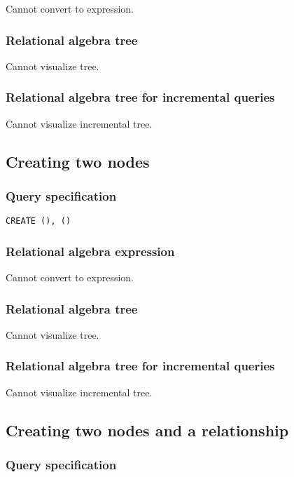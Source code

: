 Cannot convert to expression.

\subsubsection*{Relational algebra tree}

Cannot visualize tree.

\subsubsection*{Relational algebra tree for incremental queries}

Cannot visualize incremental tree.

\subsection{Creating two nodes}

\subsubsection*{Query specification}

\begin{lstlisting}
CREATE (), ()
\end{lstlisting}

\subsubsection*{Relational algebra expression}

Cannot convert to expression.

\subsubsection*{Relational algebra tree}

Cannot visualize tree.

\subsubsection*{Relational algebra tree for incremental queries}

Cannot visualize incremental tree.

\subsection{Creating two nodes and a relationship}

\subsubsection*{Query specification}

